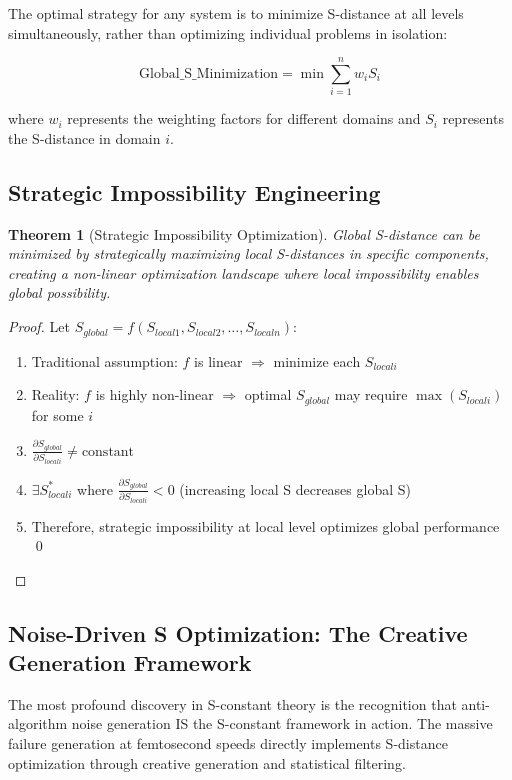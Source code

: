 \documentclass[12pt,a4paper]{article}
\newtheorem{theorem}{Theorem}[section]
\begin{document}
{The optimal strategy for any system is to minimize S-distance at all levels simultaneously, rather than optimizing individual problems in isolation:

$$\text{Global\_S\_Minimization} = \min \sum_{i=1}^{n} w_i S_i$$

where $w_i$ represents the weighting factors for different domains and $S_i$ represents the S-distance in domain $i$.

\subsection{Strategic Impossibility Engineering}

\begin{theorem}[Strategic Impossibility Optimization]
Global S-distance can be minimized by strategically maximizing local S-distances in specific components, creating a non-linear optimization landscape where local impossibility enables global possibility.
\end{theorem}

\begin{proof}
Let $S_{global} = f(S_{local1}, S_{local2}, \ldots, S_{localn})$:
\begin{enumerate}
\item Traditional assumption: $f$ is linear $\Rightarrow$ minimize each $S_{locali}$
\item Reality: $f$ is highly non-linear $\Rightarrow$ optimal $S_{global}$ may require $\max(S_{locali})$ for some $i$
\item $\frac{\partial S_{global}}{\partial S_{locali}} \neq \text{constant}$
\item $\exists S_{locali}^*$ where $\frac{\partial S_{global}}{\partial S_{locali}} < 0$ (increasing local S decreases global S)
\item Therefore, strategic impossibility at local level optimizes global performance \qed
\end{enumerate}
\end{proof}

\subsection{Noise-Driven S Optimization: The Creative Generation Framework}

The most profound discovery in S-constant theory is the recognition that anti-algorithm noise generation IS the S-constant framework in action. The massive failure generation at femtosecond speeds directly implements S-distance optimization through creative generation and statistical filtering.

}
\end{document}
